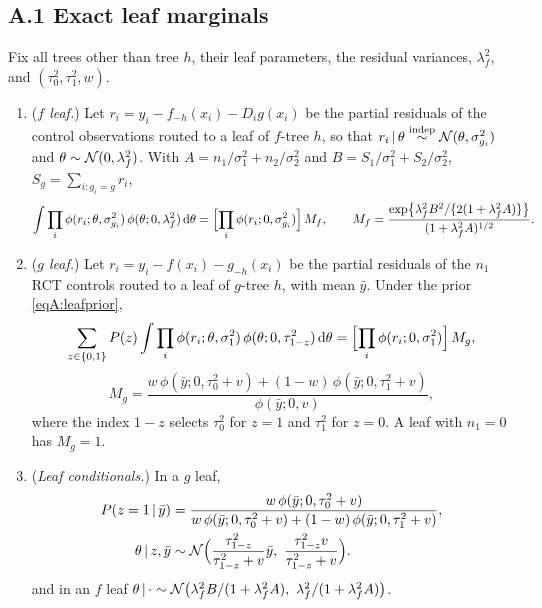 \subsection*{A.1 Exact leaf marginals}

\begin{lemA}\label{lem:marg}
Fix all trees other than tree $h$, their leaf parameters, the residual variances, $\lambda_f^2$, and $(\tau_0^2,\tau_1^2,w)$.
\begin{enumerate}[label=(\alph*),leftmargin=2.2em]
\item (\emph{$f$ leaf.}) Let $r_i=y_i-f_{-h}(x_i)-D_ig(x_i)$ be the partial residuals of the control observations routed to a leaf of $f$-tree $h$, so that $r_i\,\vert\,\theta\stackrel{\text{indep}}{\sim}\mathcal{N}(\theta,\sigma^2_{g_i})$ and $\theta\sim\mathcal{N}(0,\lambda_f^2)$. With $A=n_1/\sigma_1^2+n_2/\sigma_2^2$ and $B=S_1/\sigma_1^2+S_2/\sigma_2^2$, $S_g=\sum_{i:g_i=g}r_i$,
\begin{equation}
\int\prod_i\phi(r_i;\theta,\sigma^2_{g_i})\,\phi(\theta;0,\lambda_f^2)\,\mathrm{d}\theta
=\Bigl[\prod_i\phi(r_i;0,\sigma^2_{g_i})\Bigr]\,M_f,\qquad
M_f=\frac{\exp\bigl\{\lambda_f^2B^2/\{2(1+\lambda_f^2A)\}\bigr\}}{(1+\lambda_f^2A)^{1/2}}.
\label{eqA:Mf}
\end{equation}
\item (\emph{$g$ leaf.}) Let $r_i=y_i-f(x_i)-g_{-h}(x_i)$ be the partial residuals of the $n_1$ RCT controls routed to a leaf of $g$-tree $h$, with mean $\bar y$. Under the prior \eqref{eqA:leafprior},
\begin{equation}
\sum_{z\in\{0,1\}}P(z)\int\prod_i\phi(r_i;\theta,\sigma_1^2)\,\phi(\theta;0,\tau_{1-z}^2)\,\mathrm{d}\theta
=\Bigl[\prod_i\phi(r_i;0,\sigma_1^2)\Bigr]\,M_g,
\label{eqA:Mg}
\end{equation}
\begin{equation}
M_g=\frac{w\,\phi(\bar y;0,\tau_0^2+v)+(1-w)\,\phi(\bar y;0,\tau_1^2+v)}{\phi(\bar y;0,v)},
\label{eq:Mg2}
\end{equation}
where the index $1-z$ selects $\tau_0^2$ for $z=1$ and $\tau_1^2$ for $z=0$. A leaf with $n_1=0$ has $M_g=1$.
\item (\emph{Leaf conditionals.}) In a $g$ leaf,
\begin{equation}
\begin{aligned}
P(z=1\given\bar y)&=\frac{w\,\phi(\bar y;0,\tau_0^2+v)}{w\,\phi(\bar y;0,\tau_0^2+v)+(1-w)\,\phi(\bar y;0,\tau_1^2+v)},\\
\theta\given z,\bar y&\sim\Normal\Bigl(\frac{\tau_{1-z}^2}{\tau_{1-z}^2+v}\bar y,\ \frac{\tau_{1-z}^2v}{\tau_{1-z}^2+v}\Bigr).
\end{aligned}
\label{eq:leafcond}
\end{equation}
and in an $f$ leaf $\theta\given\cdot\sim\Normal\bigl(\lambda_f^2B/(1+\lambda_f^2A),\ \lambda_f^2/(1+\lambda_f^2A)\bigr)$.
\end{enumerate}
\end{lemA}


